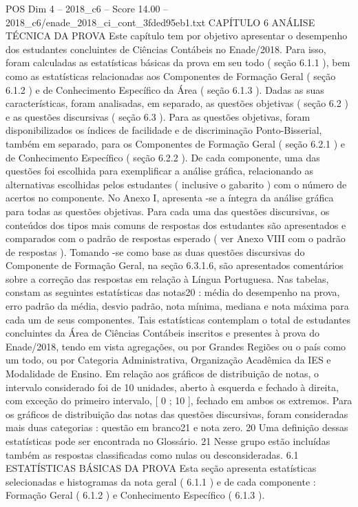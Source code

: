 \begin{textsample}{POS Dim 4 – 2018\_c6 – Score 14.00 – 2018\_c6/enade\_2018\_ci\_cont\_3fded95eb1.txt}  \label{ex:f4_pos_006}
CAPÍTULO 6 ANÁLISE TÉCNICA DA PROVA Este capítulo tem por objetivo apresentar o desempenho dos estudantes concluintes de Ciências Contábeis no Enade/2018.
Para isso, foram calculadas as estatísticas básicas da prova em seu todo ( seção 6.1.1 ), bem como as estatísticas relacionadas aos Componentes de Formação Geral ( seção 6.1.2 ) e de Conhecimento Específico da Área ( seção 6.1.3 ).
Dadas as suas características, foram analisadas, em separado, as questões objetivas ( seção 6.2 ) e as questões discursivas ( seção 6.3 ).
Para as questões objetivas, foram disponibilizados os índices de facilidade e de discriminação Ponto-Bisserial, também em separado, para os Componentes de Formação Geral ( seção 6.2.1 ) e de Conhecimento Específico ( seção 6.2.2 ).
De cada componente, uma das questões foi escolhida para exemplificar a análise gráfica, relacionando as alternativas escolhidas pelos estudantes ( inclusive o gabarito ) com o número de acertos no componente.
No Anexo I, apresenta -se a íntegra da análise gráfica para todas as questões objetivas.
Para cada uma das questões discursivas, os conteúdos dos tipos mais comuns de respostas dos estudantes são apresentados e comparados com o padrão de respostas esperado ( ver Anexo VIII com o padrão de respostas ).
Tomando -se como base as duas questões discursivas do Componente de Formação Geral, na seção 6.3.1.6, são apresentados comentários sobre a correção das respostas em relação à Língua Portuguesa.
Nas tabelas, constam as seguintes estatísticas das notas20 : média do desempenho na prova, erro padrão da média, desvio padrão, nota mínima, mediana e nota máxima para cada um de seus componentes.
Tais estatísticas contemplam o total de estudantes concluintes da Área de Ciências Contábeis inscritos e presentes à prova do Enade/2018, tendo em vista agregações, ou por Grandes Regiões ou o país como um todo, ou por Categoria Administrativa, Organização Acadêmica da IES e Modalidade de Ensino.
Em relação aos gráficos de distribuição de notas, o intervalo considerado foi de 10 unidades, aberto à esquerda e fechado à direita, com exceção do primeiro intervalo, [ 0 ; 10 ], fechado em ambos os extremos.
Para os gráficos de distribuição das notas das questões discursivas, foram consideradas mais duas categorias : questão em branco21 e nota zero. 20 Uma definição dessas estatísticas pode ser encontrada no Glossário. 21 Nesse grupo estão incluídas também as respostas classificadas como nulas ou desconsideradas. 6.1 ESTATÍSTICAS BÁSICAS DA PROVA Esta seção apresenta estatísticas selecionadas e histogramas da nota geral ( 6.1.1 ) e de cada componente : Formação Geral ( 6.1.2 ) e Conhecimento Específico ( 6.1.3 ).

\end{textsample}
